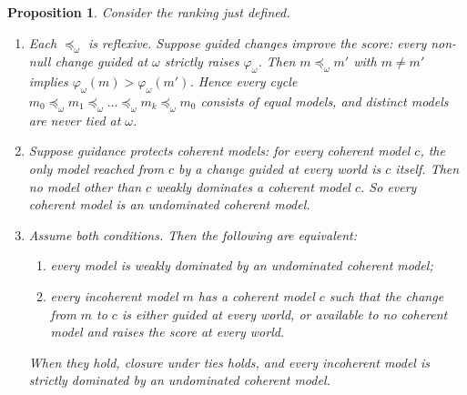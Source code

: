 \documentclass[11pt]{article}
\newtheorem{proposition}[theorem]{Proposition}
\theoremstyle{definition}
\theoremstyle{remark}
\begin{document}
\begin{proposition}\label{prop:construct}
Consider the ranking just defined.
\begin{enumerate}[label=(\alph*)]
\item Each $\preceq_\omega$ is reflexive. Suppose \emph{guided changes improve the score}: every non-null change guided at $\omega$ strictly raises $\varphi_\omega$. Then $m\preceq_\omega m'$ with $m\ne m'$ implies $\varphi_\omega(m)>\varphi_\omega(m')$. Hence every cycle $m_0\preceq_\omega m_1\preceq_\omega\dots\preceq_\omega m_k\preceq_\omega m_0$ consists of equal models, and distinct models are never tied at $\omega$.
\item Suppose \emph{guidance protects coherent models}: for every coherent model $c$, the only model reached from $c$ by a change guided at every world is $c$ itself. Then no model other than $c$ weakly dominates a coherent model $c$. So every coherent model is an undominated coherent model.
\item Assume both conditions. Then the following are equivalent:
\begin{enumerate}[label=(\roman*)]
\item every model is weakly dominated by an undominated coherent model;
\item every incoherent model $m$ has a coherent model $c$ such that the change from $m$ to $c$ is either guided at every world, or available to no coherent model and raises the score at every world.
\end{enumerate}
When they hold, closure under ties holds, and every incoherent model is strictly dominated by an undominated coherent model.
\end{enumerate}
\end{proposition}
\end{document}
